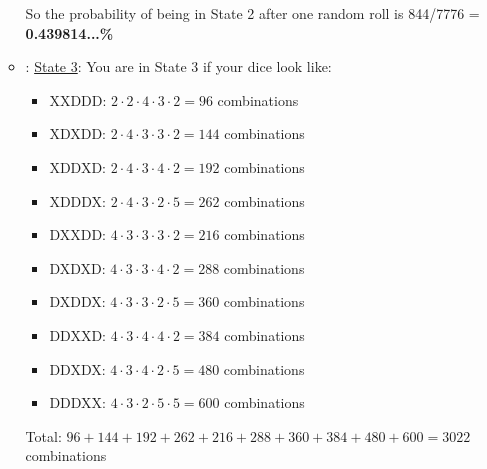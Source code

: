 \documentclass[12pt,a4paper]{article}
\begin{document}
\begin{itemize}
\begin{itemize}
    So the probability of being in State 2 after one random roll is 844/7776 = \textbf{0.439814...\%}
    \item: \underline{State 3}: You are in State 3 if your dice look like:
    \begin{itemize}
        \item XXDDD: $2 \cdot 2 \cdot 4 \cdot 3 \cdot 2 = 96$ combinations
        \item XDXDD: $2 \cdot 4 \cdot 3 \cdot 3 \cdot 2 = 144$ combinations
        \item XDDXD: $2 \cdot 4 \cdot 3 \cdot 4 \cdot 2 = 192$ combinations
        \item XDDDX: $2 \cdot 4 \cdot 3 \cdot 2 \cdot 5 = 262$ combinations
        \item DXXDD: $4 \cdot 3 \cdot 3 \cdot 3 \cdot 2 = 216$ combinations
        \item DXDXD: $4 \cdot 3 \cdot 3 \cdot 4 \cdot 2 = 288$ combinations
        \item DXDDX: $4 \cdot 3 \cdot 3 \cdot 2 \cdot 5 = 360$ combinations
        \item DDXXD: $4 \cdot 3 \cdot 4 \cdot 4 \cdot 2 = 384$ combinations
        \item DDXDX: $4 \cdot 3 \cdot 4 \cdot 2 \cdot 5 = 480$ combinations
        \item DDDXX: $4 \cdot 3 \cdot 2 \cdot 5 \cdot 5 = 600$ combinations
    \end{itemize}
    Total: $96 + 144 + 192 + 262 + 216 + 288 + 360 + 384 + 480 + 600 = 3022$ combinations


\end{itemize}
\end{itemize}
\end{document}
